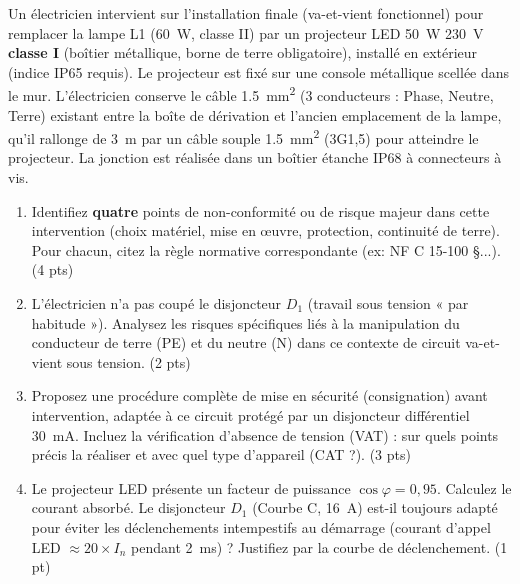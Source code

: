 \documentclass[11pt]{article}
\begin{document}
\begin{exercice}
Un électricien intervient sur l'installation finale (va-et-vient fonctionnel) pour remplacer la lampe L1 (\SI{60}{W}, classe II) par un projecteur LED \SI{50}{W} \SI{230}{V} \textbf{classe I} (boîtier métallique, borne de terre obligatoire), installé en extérieur (indice IP65 requis). Le projecteur est fixé sur une console métallique scellée dans le mur. L'électricien conserve le câble \SI{1,5}{mm^2} (3 conducteurs : Phase, Neutre, Terre) existant entre la boîte de dérivation et l'ancien emplacement de la lampe, qu'il rallonge de \SI{3}{m} par un câble souple \SI{1,5}{mm^2} (3G1,5) pour atteindre le projecteur. La jonction est réalisée dans un boîtier étanche IP68 à connecteurs à vis.

\begin{enumerate}
\item Identifiez \textbf{quatre} points de non-conformité ou de risque majeur dans cette intervention (choix matériel, mise en œuvre, protection, continuité de terre). Pour chacun, citez la règle normative correspondante (ex: NF C 15-100 §...). (4 pts)
\item L'électricien n'a pas coupé le disjoncteur $D_1$ (travail sous tension « par habitude »). Analysez les risques spécifiques liés à la manipulation du conducteur de terre (PE) et du neutre (N) dans ce contexte de circuit va-et-vient sous tension. (2 pts)
\item Proposez une procédure complète de mise en sécurité (consignation) avant intervention, adaptée à ce circuit protégé par un disjoncteur différentiel \SI{30}{mA}. Incluez la vérification d'absence de tension (VAT) : sur quels points précis la réaliser et avec quel type d'appareil (CAT ?). (3 pts)
\item Le projecteur LED présente un facteur de puissance $\cos\varphi = 0,95$. Calculez le courant absorbé. Le disjoncteur $D_1$ (Courbe C, \SI{16}{A}) est-il toujours adapté pour éviter les déclenchements intempestifs au démarrage (courant d'appel LED $\approx 20 \times I_n$ pendant \SI{2}{ms}) ? Justifiez par la courbe de déclenchement. (1 pt)
\end{enumerate}
\end{exercice}
\end{document}
